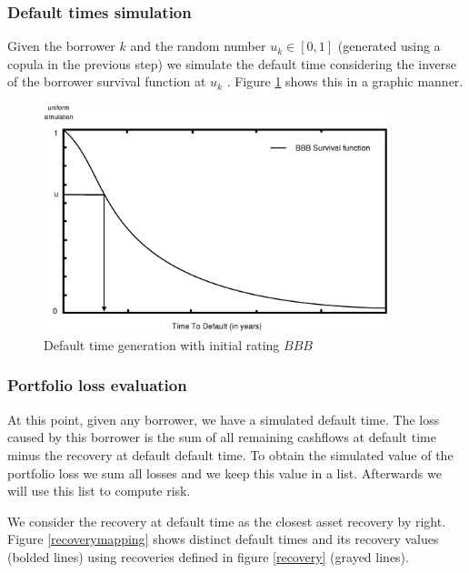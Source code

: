 \documentclass[a4paper,12pt,final]{article}
\begin{document}
\subsubsection{Default times simulation}
\label{sec:deftimessim}
Given the borrower $k$ and the random number $u_k \in [0,1]$ (generated using a 
copula in the previous step) we simulate the default time considering the 
inverse of the borrower survival function at $u_k$ \cite{ref:cred_risk}. 
Figure \ref{simttd} shows this in a graphic manner.

\begin{figure}[!hbt]
\begin{center}
\includegraphics[width=10cm,angle=0]{./images/simttd.eps}
\caption{Default time generation with initial rating $BBB$}
\label{simttd}
\end{center}
\end{figure}
\FloatBarrier

\subsubsection{Portfolio loss evaluation}
\label{sec:portfolioloss}
At this point, given any borrower, we have a simulated default time. The loss
caused by this borrower is the sum of all remaining cashflows at default time 
minus the recovery at default default time. To obtain the simulated 
value of the portfolio loss we sum all losses and we keep this value 
in a list. Afterwards we will use this list to compute risk.
\newline


We consider the recovery at default time as the closest asset recovery by right.
Figure \ref{recoverymapping} shows distinct default times and its recovery 
values (bolded lines) using recoveries defined in figure \ref{recovery} 
(grayed lines).
\end{document}
